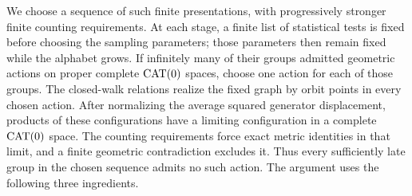 We choose a sequence of such finite presentations, with progressively stronger
finite counting requirements.  At each stage, a finite list of statistical
tests is fixed before choosing the sampling parameters; those parameters then
remain fixed while the alphabet grows.  If infinitely many of their groups admitted
geometric actions on proper complete $\operatorname{CAT}(0)$ spaces, choose one
action for each of those groups.
The closed-walk relations realize the fixed graph by orbit points in every
chosen action.  After normalizing the average squared generator displacement,
products of these configurations have a limiting configuration in a complete
$\operatorname{CAT}(0)$ space.  The counting requirements force exact metric identities in
that limit, and a finite geometric contradiction excludes it.  Thus every
sufficiently late group in the chosen sequence admits no such action.  The argument uses the following three ingredients.

